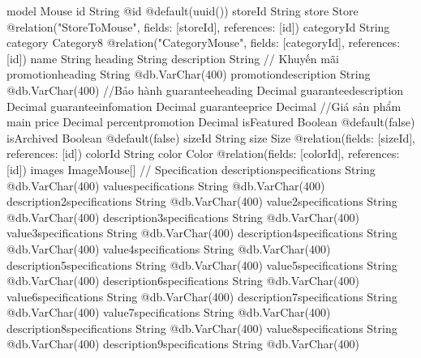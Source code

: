 model Mouse {
  id                          String                     @id @default(uuid())
  storeId                     String
  store                       Store                      @relation("StoreToMouse", fields: [storeId], references: [id])
  categoryId             String
  category            Category8             @relation("CategoryMouse", fields: [categoryId], references: [id])
  name                        String
  heading                     String
  description                 String
  // Khuyến mãi
  promotionheading            String                     @db.VarChar(400)
  promotiondescription        String                     @db.VarChar(400)
  //Bảo hành
  guaranteeheading            Decimal
  guaranteedescription        Decimal
  guaranteeinfomation         Decimal
  guaranteeprice              Decimal
  //Giá sản phẩm main
  price                       Decimal
  percentpromotion            Decimal
  isFeatured                  Boolean                    @default(false)
  isArchived                  Boolean                    @default(false)
  sizeId                      String
  size                        Size                       @relation(fields: [sizeId], references: [id])
  colorId                     String
  color                       Color                      @relation(fields: [colorId], references: [id])
  images                  ImageMouse[]
  // Specification
  descriptionspecifications   String                     @db.VarChar(400)
  valuespecifications         String                     @db.VarChar(400)
  description2specifications  String                     @db.VarChar(400)
  value2specifications        String                     @db.VarChar(400)
  description3specifications  String                     @db.VarChar(400)
  value3specifications        String                     @db.VarChar(400)
  description4specifications  String                     @db.VarChar(400)
  value4specifications        String                     @db.VarChar(400)
  description5specifications  String                     @db.VarChar(400)
  value5specifications        String                     @db.VarChar(400)
  description6specifications  String                     @db.VarChar(400)
  value6specifications        String                     @db.VarChar(400)
  description7specifications  String                     @db.VarChar(400)
  value7specifications        String                     @db.VarChar(400)
  description8specifications  String                     @db.VarChar(400)
  value8specifications        String                     @db.VarChar(400)
  description9specifications  String                     @db.VarChar(400)
}
